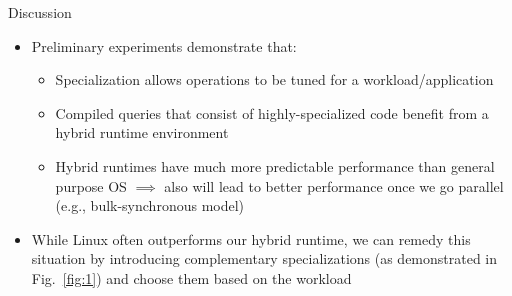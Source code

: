 \begin{block}{Discussion}

  \begin{itemize}
  \item Preliminary experiments demonstrate that:
    \begin{itemize}
    \item Specialization allows operations to be tuned for a workload/application
    \item Compiled queries that consist of highly-specialized code benefit from a hybrid runtime environment
    \item Hybrid runtimes have much more predictable performance than general purpose OS $\implies$ also will lead to better performance once we go parallel (e.g., bulk-synchronous model)
    \end{itemize}
  \item While Linux often outperforms our hybrid runtime, we can remedy this situation by introducing complementary specializations (as demonstrated in Fig.~\ref{fig:1}) and choose them based on the workload
  \end{itemize}


\end{block}
